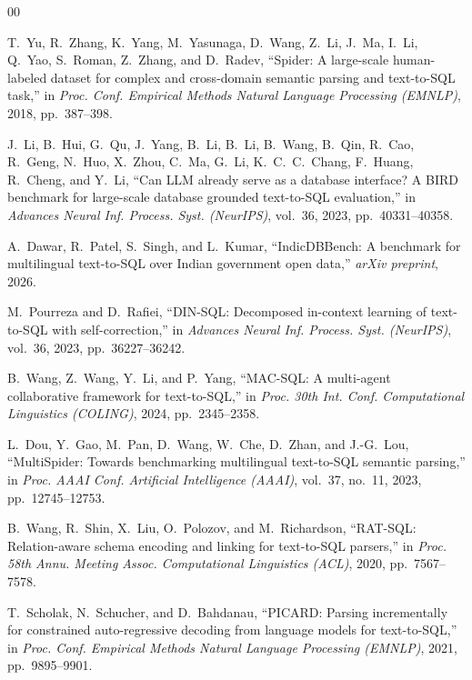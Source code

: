 \documentclass[conference]{IEEEtran}
\begin{document}
\begin{thebibliography}{00}

T.~Yu, R.~Zhang, K.~Yang, M.~Yasunaga, D.~Wang, Z.~Li, J.~Ma, I.~Li, Q.~Yao, S.~Roman, Z.~Zhang, and D.~Radev, ``Spider: A large-scale human-labeled dataset for complex and cross-domain semantic parsing and text-to-{SQL} task,'' in \emph{Proc. Conf. Empirical Methods Natural Language Processing (EMNLP)}, 2018, pp.~387--398.

J.~Li, B.~Hui, G.~Qu, J.~Yang, B.~Li, B.~Li, B.~Wang, B.~Qin, R.~Cao, R.~Geng, N.~Huo, X.~Zhou, C.~Ma, G.~Li, K.~C.~C.~Chang, F.~Huang, R.~Cheng, and Y.~Li, ``Can {LLM} already serve as a database interface? A {BIRD} benchmark for large-scale database grounded text-to-{SQL} evaluation,'' in \emph{Advances Neural Inf. Process. Syst. (NeurIPS)}, vol.~36, 2023, pp.~40331--40358.

A.~Dawar, R.~Patel, S.~Singh, and L.~Kumar, ``{IndicDBBench}: A benchmark for multilingual text-to-{SQL} over Indian government open data,'' \emph{arXiv preprint}, 2026.

M.~Pourreza and D.~Rafiei, ``{DIN-SQL}: Decomposed in-context learning of text-to-{SQL} with self-correction,'' in \emph{Advances Neural Inf. Process. Syst. (NeurIPS)}, vol.~36, 2023, pp.~36227--36242.

B.~Wang, Z.~Wang, Y.~Li, and P.~Yang, ``{MAC-SQL}: A multi-agent collaborative framework for text-to-{SQL},'' in \emph{Proc. 30th Int. Conf. Computational Linguistics (COLING)}, 2024, pp.~2345--2358.

L.~Dou, Y.~Gao, M.~Pan, D.~Wang, W.~Che, D.~Zhan, and J.-G.~Lou, ``{MultiSpider}: Towards benchmarking multilingual text-to-{SQL} semantic parsing,'' in \emph{Proc. AAAI Conf. Artificial Intelligence (AAAI)}, vol.~37, no.~11, 2023, pp.~12745--12753.

B.~Wang, R.~Shin, X.~Liu, O.~Polozov, and M.~Richardson, ``{RAT-SQL}: Relation-aware schema encoding and linking for text-to-{SQL} parsers,'' in \emph{Proc. 58th Annu. Meeting Assoc. Computational Linguistics (ACL)}, 2020, pp.~7567--7578.

T.~Scholak, N.~Schucher, and D.~Bahdanau, ``{PICARD}: Parsing incrementally for constrained auto-regressive decoding from language models for text-to-{SQL},'' in \emph{Proc. Conf. Empirical Methods Natural Language Processing (EMNLP)}, 2021, pp.~9895--9901.


\end{thebibliography}
\end{document}
